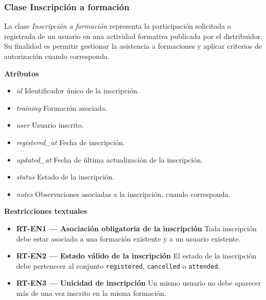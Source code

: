 \subsubsection{Clase Inscripción a formación}

La clase \textit{Inscripción a formación} representa la participación solicitada o registrada de un usuario en una actividad formativa publicada por el distribuidor. Su finalidad es permitir gestionar la asistencia a formaciones y aplicar criterios de autorización cuando corresponda.

\textbf{Atributos}

\begin{itemize}

      \item \textit{id}
            Identificador único de la inscripción.
      \item \textit{training}
            Formación asociada.
      \item \textit{user}
            Usuario inscrito.
      \item \textit{registered\_at}
            Fecha de inscripción.
      \item \textit{updated\_at}
            Fecha de última actualización de la inscripción.
      \item \textit{status}
            Estado de la inscripción.
      \item \textit{notes}
            Observaciones asociadas a la inscripción, cuando corresponda.

\end{itemize}

\textbf{Restricciones textuales}

\begin{itemize}

      \item \textbf{RT-EN1 — Asociación obligatoria de la inscripción}
            Toda inscripción debe estar asociada a una formación existente y a un usuario existente.
      \item \textbf{RT-EN2 — Estado válido de la inscripción}
            El estado de la inscripción debe pertenecer al conjunto \texttt{registered}, \texttt{cancelled} o \texttt{attended}.
      \item \textbf{RT-EN3 — Unicidad de inscripción}
            Un mismo usuario no debe aparecer más de una vez inscrito en la misma formación.

\end{itemize}

